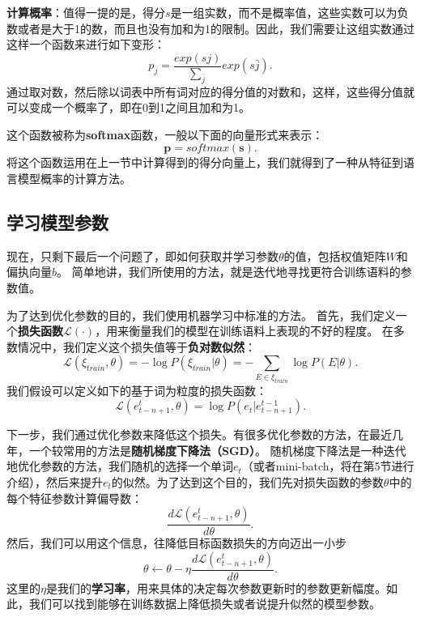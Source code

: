 \documentclass[10pt,a4paper]{ctexart}
\begin{document}
\textbf{计算概率}：值得一提的是，得分\textbf{$s$}是一组实数，而不是概率值，这些实数可以为负数或者是大于1的数，而且也没有加和为1的限制。因此，我们需要让这组实数通过这样一个函数来进行如下变形：
\[
 p_{j} = \frac{exp(sj)}{\sum_{\bar{j}}}exp(s\bar{j}).
\]
通过取对数，然后除以词表中所有词对应的得分值的对数和，这样，这些得分值就可以变成一个概率了，即在0到1之间且加和为1。

这个函数被称为\textbf{softmax}函数，一般以下面的向量形式来表示：
\[
 \textbf{p} = softmax(\textbf{s}).
\]
将这个函数运用在上一节中计算得到的得分向量上，我们就得到了一种从特征到语言模型概率的计算方法。

\subsection{学习模型参数}
现在，只剩下最后一个问题了，即如何获取并学习参数$\theta$的值，包括权值矩阵$W$和偏执向量$b$。
简单地讲，我们所使用的方法，就是迭代地寻找更符合训练语料的参数值。

为了达到优化参数的目的，我们使用机器学习中标准的方法。
首先，我们定义一个\textbf{损失函数}$\mathcal{L}(\cdot)$，用来衡量我们的模型在训练语料上表现的不好的程度。
在多数情况中，我们定义这个损失值等于\textbf{负对数似然}：
\[
 \mathcal{L}( \xi_{train},\theta ) = - \log P(\xi_{train} | \theta ) = - \sum_{E \in \xi_{train}} \log P(E |\theta).
\]
我们假设可以定义如下的基于词为粒度的损失函数：
\[
 \mathcal{L}(e_{t-n+1}^{t},\theta) = \log P(e_t | e_{t-n+1}^{t-1}).
\]

下一步，我们通过优化参数来降低这个损失。有很多优化参数的方法，在最近几年，一个较常用的方法是\textbf{随机梯度下降法（SGD）}。
随机梯度下降法是一种迭代地优化参数的方法，我们随机的选择一个单词$e_t$（或者mini-batch，将在第5节进行介绍），然后来提升$e_t$的似然。为了达到这个目的，我们先对损失函数的参数$\theta$中的每个特征参数计算偏导数：
\[
 \frac{d\mathcal{L}(e_{t-n+1}^{t},\theta)}{d\theta}.
\]
然后，我们可以用这个信息，往降低目标函数损失的方向迈出一小步
\[
 \theta \leftarrow \theta - \eta \frac{d\mathcal{L}(e_{t-n+1}^{t},\theta)}{d\theta}.
\]
这里的$\eta$是我们的\textbf{学习率}，用来具体的决定每次参数更新时的参数更新幅度。如此，我们可以找到能够在训练数据上降低损失或者说提升似然的模型参数。
\end{document}
